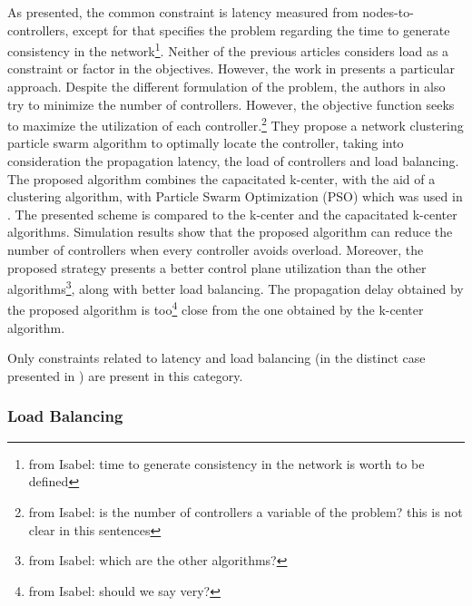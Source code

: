 \documentclass{IEEEtran}
\newcommand\fia[1]{{\color{red}\footnote{\color{red}from Isabel: #1}}} %
\begin{document}
As presented, the common constraint is latency measured from nodes-to-controllers, except for \cite{JiCe14} that specifies the problem regarding the time to generate consistency in the network\fia{time to generate consistency in the network is worth to be defined}. Neither of the previous articles considers load as a constraint or factor in the objectives. However, the work in \cite{LiWa15} presents a particular approach.
Despite the different formulation of the problem, the authors in \cite{LiWa15} also try to minimize the number of controllers. However, the objective function seeks to maximize the utilization of each controller.\fia{is the number of controllers a variable of the problem? this is not clear in this sentences} They propose a network clustering particle swarm algorithm to optimally locate the controller, taking into consideration the propagation latency, the load of controllers and load balancing. The proposed algorithm combines the capacitated k-center, with the aid of a clustering algorithm, with Particle Swarm Optimization (PSO) which was used in \cite{GaWa15}. The presented scheme is compared to the k-center and the capacitated k-center algorithms. Simulation results show that the proposed algorithm can reduce the number of controllers when every controller avoids overload. Moreover, the proposed strategy presents a better control plane utilization than the other algorithms\fia{which are the other algorithms?}, along with better load balancing. The propagation delay obtained by the proposed algorithm is too\fia{should we say very?} close from the one obtained by the k-center algorithm. 

Only constraints related to latency and load balancing (in the distinct case presented in \cite{LiWa15}) are present in this category.

\subsubsection{Load Balancing}
\end{document}
